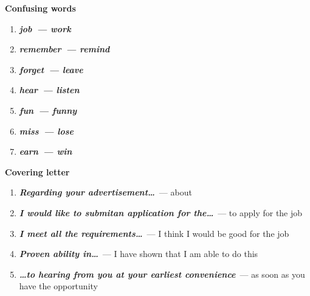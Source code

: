 \documentclass[10pt,a4paper]{article}
\begin{document}
\textbf{Confusing words}
\begin{enumerate}
  \item \textit{\textbf{job~--- work}}
  \item \textit{\textbf{remember~--- remind}}
  \item \textit{\textbf{forget~--- leave}}
  \item \textit{\textbf{hear~--- listen}}
  \item \textit{\textbf{fun~--- funny}}
  \item \textit{\textbf{miss~--- lose}}
  \item \textit{\textbf{earn~--- win}}
\end{enumerate}

\par\medskip\textbf{Covering letter}
\begin{enumerate}
  \item \textit{\textbf{Regarding your advertisement\dots}}~--- about
  \item \textit{\textbf{I would like to submitan application for the\dots}}~--- to apply for the job
  \item \textit{\textbf{I meet all the requirements\dots}}~--- I think I would be good for the job
  \item \textit{\textbf{Proven ability in\dots}}~--- I have shown that I am able to do this
  \item \textit{\textbf{\dots to hearing from you at your earliest convenience}}~--- as soon as you have the opportunity
\end{enumerate}
\end{document}
